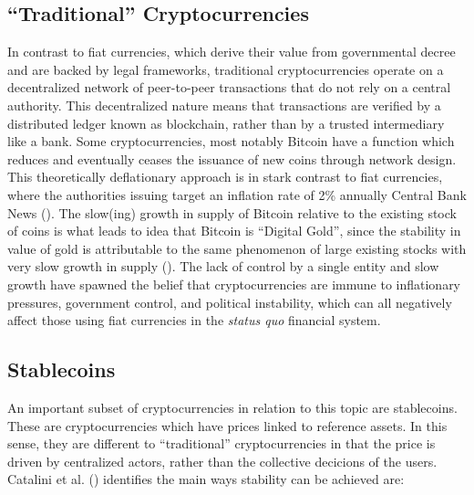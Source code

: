 \documentclass[
]{article}
\begin{document}
\subsection{``Traditional'' Cryptocurrencies}\label{traditional-cryptocurrencies}

In contrast to fiat currencies, which derive their value from governmental decree and are backed by legal frameworks, traditional cryptocurrencies operate on a decentralized network of peer-to-peer transactions that do not rely on a central authority. This decentralized nature means that transactions are verified by a distributed ledger known as blockchain, rather than by a trusted intermediary like a bank. Some cryptocurrencies, most notably Bitcoin have a function which reduces and eventually ceases the issuance of new coins through network design. This theoretically deflationary approach is in stark contrast to fiat currencies, where the authorities issuing target an inflation rate of 2\% annually Central Bank News (). The slow(ing) growth in supply of Bitcoin relative to the existing stock of coins is what leads to idea that Bitcoin is ``Digital Gold'', since the stability in value of gold is attributable to the same phenomenon of large existing stocks with very slow growth in supply (). The lack of control by a single entity and slow growth have spawned the belief that cryptocurrencies are immune to inflationary pressures, government control, and political instability, which can all negatively affect those using fiat currencies in the \emph{status quo} financial system.

\subsection{Stablecoins}\label{stablecoins}

An important subset of cryptocurrencies in relation to this topic are stablecoins. These are cryptocurrencies which have prices linked to reference assets. In this sense, they are different to ``traditional'' cryptocurrencies in that the price is driven by centralized actors, rather than the collective decicions of the users. Catalini et al. () identifies the main ways stability can be achieved are:
\end{document}
